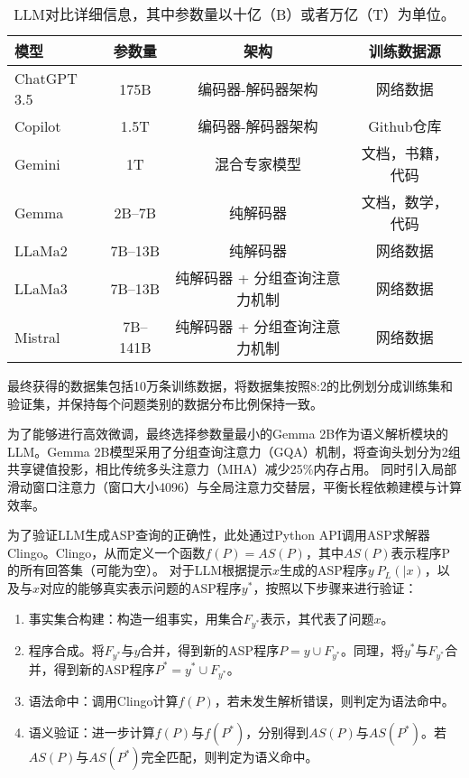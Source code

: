 \begin{table}[ht]
    \centering
    \begin{tabular}{lccc}
        \toprule
        \textbf{模型} & \textbf{参数量} & \textbf{架构} & \textbf{训练数据源} \\
        \midrule
        ChatGPT 3.5    & 175B      & 编码器-解码器架构            & 网络数据         \\
        Copilot        & 1.5T      & 编码器-解码器架构            & Github仓库    \\
        Gemini         & 1T        & 混合专家模型            & 文档，书籍，代码      \\
        Gemma          & 2B--7B    & 纯解码器         & 文档，数学，代码      \\
        LLaMa2         & 7B--13B   & 纯解码器         & 网络数据         \\
        LLaMa3         & 7B--13B   & 纯解码器 + 分组查询注意力机制   & 网络数据         \\
        Mistral        & 7B--141B  & 纯解码器 + 分组查询注意力机制   & 网络数据         \\
        \bottomrule
    \end{tabular}
    \caption{LLM对比详细信息，其中参数量以十亿（B）或者万亿（T）为单位。}
    \label{tab:llm-comparison}
\end{table}

最终获得的数据集包括10万条训练数据，将数据集按照8:2的比例划分成训练集和验证集，并保持每个问题类别的数据分布比例保持一致。

为了能够进行高效微调，最终选择参数量最小的Gemma 2B作为语义解析模块的LLM。Gemma 2B模型采用了分组查询注意力（GQA）机制，将查询头划分为2组共享键值投影，相比传统多头注意力（MHA）减少25\%内存占用。
同时引入局部滑动窗口注意力（窗口大小4096）与全局注意力交替层，平衡长程依赖建模与计算效率。

为了验证LLM生成ASP查询的正确性，此处通过Python API调用ASP求解器Clingo。Clingo，从而定义一个函数$f(P) = AS(P)$，其中$AS(P)$表示程序P的所有回答集（可能为空）。
对于LLM根据提示$x$生成的ASP程序$y ~ P_L(|x)$，以及与$x$对应的能够真实表示问题的ASP程序$y^*$，按照以下步骤来进行验证：
\begin{enumerate}
\item 事实集合构建：构造一组事实，用集合$F_{y^*}$表示，其代表了问题$x$。
\item 程序合成。将$F_{y^*}$与$y$合并，得到新的ASP程序$P = y \cup F_{y^*}$。同理，将$y^*$与$F_{y^*}$合并，得到新的ASP程序$P^* = y^* \cup F_{y^*}$。
\item 语法命中：调用Clingo计算$f(P)$，若未发生解析错误，则判定为语法命中。
\item 语义验证：进一步计算$f(P)$与$f(P^*)$，分别得到$AS(P)$与$AS(P^*)$。若$AS(P)$与$AS(P^*)$完全匹配，则判定为语义命中。
\end{enumerate}

